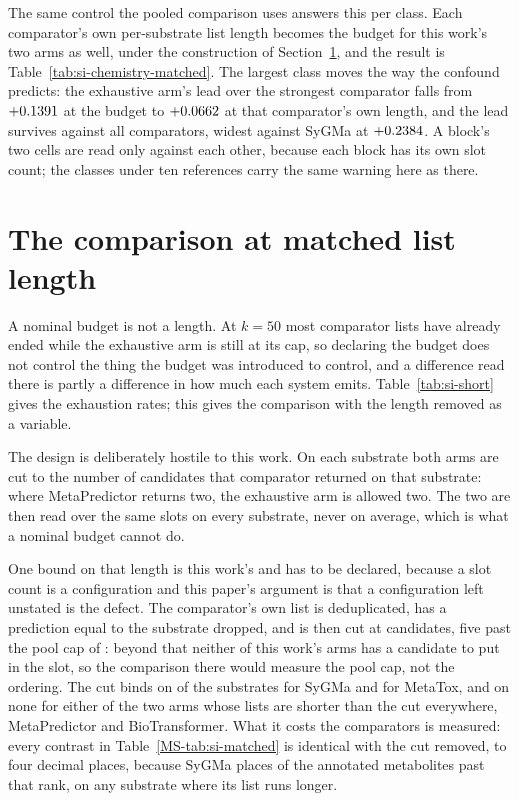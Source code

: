\documentclass[journal=jcisd8,manuscript=suppinfo,layout=onecolumn]{achemso}
\begin{document}
The same control the pooled comparison uses answers this per class. Each comparator's own
per-substrate list length becomes the budget for this work's two arms as well, under the
construction of Section~\ref{sec:si-matched}, and the result is
Table~\ref{tab:si-chemistry-matched}. The largest class moves the way the confound predicts: the
exhaustive arm's lead over the strongest comparator falls from $+0.1391$ at
the budget to $+0.0662$ at that comparator's own length, and the lead survives
against all \numChemCleavageMatchedarmsWord{} comparators, widest against SyGMa at
$+0.2384$. A block's two cells are read only against each other, because
each block has its own slot count; the classes under ten references carry
the same warning here as there.



\section{The comparison at matched list length}
\label{sec:si-matched}

A nominal budget is not a length. At $k = 50$ most comparator lists have already ended while the
exhaustive arm is still at its cap, so declaring the budget does not control the thing the budget
was introduced to control, and a difference read there is partly a difference in how much each
system emits. Table~\ref{tab:si-short} gives the exhaustion rates; this gives the comparison
with the length removed as a variable.

The design is deliberately hostile to this work. On each substrate both arms are cut to the number
of candidates that comparator returned on that substrate: where MetaPredictor returns two, the
exhaustive arm is allowed two. The two are then read over the same slots on every substrate, never
on average, which is what a nominal budget cannot do.

One bound on that length is this work's and has to be declared, because a slot count is a
configuration and this paper's argument is that a configuration left unstated is the defect. The
comparator's own list is deduplicated, has a prediction equal to the substrate dropped, and is
then cut at \numMatchedCap{} candidates, five past the pool cap of \numHNineCap{}: beyond that
neither of this work's arms has a candidate to put in the slot, so the comparison there would
measure the pool cap, not the ordering. The cut binds on \numMatchedBindssygma{} of the
\numPopulationN{} substrates for SyGMa and \numMatchedBindsmetatox{} for MetaTox, and on none
for either of the two arms whose lists are shorter than the cut everywhere, MetaPredictor and
BioTransformer. What it costs the comparators is measured: every contrast
in Table~\ref{MS-tab:si-matched} is identical with the cut removed, to four decimal places, because
SyGMa places \numMatchedPastcutsygmaWord{} of the annotated metabolites past that rank, on any
substrate where its list runs longer.
\end{document}
